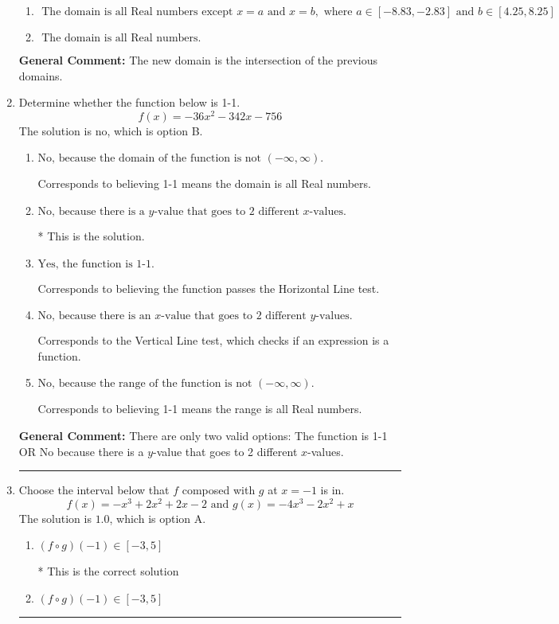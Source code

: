\documentclass{extbook}[14pt]
\newcommand{\litem}[1]{\item #1

\rule{\textwidth}{0.4pt}}
\begin{document}
\begin{enumerate}
{\begin{enumerate}[label=\Alph*.]
\item \( \text{ The domain is all Real numbers except } x = a \text{ and } x = b, \text{ where } a \in [-8.83, -2.83] \text{ and } b \in [4.25, 8.25] \)


\item \( \text{ The domain is all Real numbers. } \)


\end{enumerate}

\textbf{General Comment:} The new domain is the intersection of the previous domains.
}
\litem{
Determine whether the function below is 1-1.
\[ f(x) = -36 x^2 - 342 x - 756 \]The solution is \( \text{no} \), which is option B.\begin{enumerate}[label=\Alph*.]
\item \( \text{No, because the domain of the function is not $(-\infty, \infty)$.} \)

Corresponds to believing 1-1 means the domain is all Real numbers.
\item \( \text{No, because there is a $y$-value that goes to 2 different $x$-values.} \)

* This is the solution.
\item \( \text{Yes, the function is 1-1.} \)

Corresponds to believing the function passes the Horizontal Line test.
\item \( \text{No, because there is an $x$-value that goes to 2 different $y$-values.} \)

Corresponds to the Vertical Line test, which checks if an expression is a function.
\item \( \text{No, because the range of the function is not $(-\infty, \infty)$.} \)

Corresponds to believing 1-1 means the range is all Real numbers.
\end{enumerate}

\textbf{General Comment:} There are only two valid options: The function is 1-1 OR No because there is a $y$-value that goes to 2 different $x$-values.
}
\litem{
Choose the interval below that $f$ composed with $g$ at $x=-1$ is in.
\[ f(x) = -x^{3} +2 x^{2} +2 x -2 \text{ and } g(x) = -4x^{3} -2 x^{2} +x \]The solution is \( 1.0 \), which is option A.\begin{enumerate}[label=\Alph*.]
\item \( (f \circ g)(-1) \in [-3, 5] \)

* This is the correct solution
\item \( (f \circ g)(-1) \in [-3, 5] \)


\end{enumerate}}
\end{enumerate}
\end{document}
